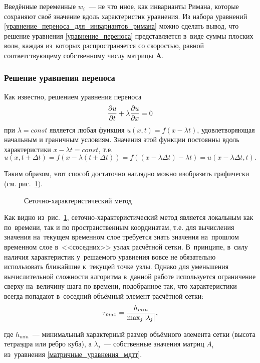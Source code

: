 \documentclass[thesis.tex]{subfiles}
\begin{document}
Введённые переменные $w_i$~--- не что иное, как инварианты Римана, которые сохраняют своё значение вдоль характеристик
уравнения. Из набора уравнений \ref{уравнение_переноса_для_инвариантов_римана} можно сделать вывод, что решение
уравнения \ref{уравнение_переноса} представляется в~виде суммы плоских волн, каждая из~которых распространяется со
скоростью, равной соответствующему собственному числу матрицы $\mathbf A$.

\subsubsection{Решение уравнения переноса}
Как известно, решением уравнения переноса
\[
    \frac{\partial{u}}{\partial{t}}+\lambda\frac{\partial{u}}{\partial{x}}=0
\]
при $\lambda=const$ является любая функция $u(x,t)=f(x-\lambda t)$, удовлетворяющая начальным и граничным условиям.
Значения этой функции постоянны вдоль характеристики $x-\lambda t=const$, т.е.
\[
    u(x,t+\Delta t) = f(x-\lambda(t+\Delta t)) = f((x-\lambda\Delta t) - \lambda t) = u(x-\lambda\Delta t, t).
\]

Таким образом, этот способ достаточно наглядно можно изобразить графически (см. рис.~\ref{рис:схм}).
\begin{figure}[h]
    \begin{center}
        
    \end{center}
    \caption{Сеточно-характеристический метод}
    \label{рис:схм}
\end{figure}

Как видно из~рис.~\ref{рис:схм}, сеточно-характеристический метод является локальным как по~времени, так и по
пространственным координатам, т.е. для вычисления значения на~текущем временном слое требуется знать значения на~прошлом
временном слое в~<<соседних>> узлах расчётной сетки. В~принципе, в~силу наличия характеристик у~решаемого
уравнения вовсе не обязательно \cite{васюков2012диссертация} использовать ближайшие к~текущей точке узлы. Однако для
уменьшения вычислительной сложности алгоритма в~данной работе используется ограничение сверху на~величину шага по
времени, подобранное так, что характеристики всегда попадают в~соседний объёмный элемент расчётной сетки:
\[
    \tau_{max} = \frac{h_{min}}{\max_j \left|\lambda_j\right|},
\]

где $h_{min}$~--- минимальный характерный размер объёмного элемента сетки (высота тетраэдра или ребро куба), а
$\lambda_j$~--- собственные значения матриц $A_i$ из~уравнения \ref{матричные_уравнения_мдтт}.
\end{document}
